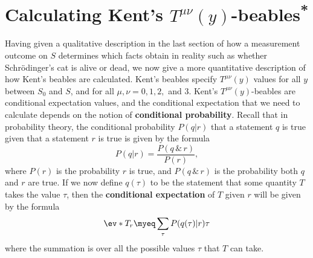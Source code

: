 \documentclass[12pt]{report}
\begin{document}


\section{Calculating Kent's $T^{\mu\nu}(y)$-beables\textsuperscript{*} \label{kentcalculation}}
Having given a qualitative description in the last section of how a measurement outcome on $S$ determines which facts obtain in reality such as whether Schr\"{o}dinger's cat is alive or dead, we now give a more quantitative description of how Kent's beables are calculated. Kent's beables specify $T^{\mu\nu}(y)$ values for all $y$ between $S_0$ and $S$, and for all $\mu,\nu = 0, 1, 2,$ and $3$. Kent's $T^{\mu\nu}(y)$-beables are conditional expectation values, and the conditional expectation that we need to calculate depends on the notion of \textbf{conditional probability}. Recall that in probability theory, the conditional probability $P(q|r)$  %
%
that a statement $q$ is true given that a statement $r$ is true is given by the formula
\begin{equation} \label{conditionalprobability}
  P(q|r)=\frac{P(q\, \&\,  r)}{P(r)},
\end{equation} 
where $P(r)$  %
%
is the probability $r$ is true, and $P(q\, \&\,  r)$ is the probability both $q$ and $r$ are true.
If we now define $q(\tau)$ to be %
%
 the statement that some quantity $T$  takes the value $\tau$, then the  \textbf{conditional expectation} of  $T$ given $r$ will be given by the formula
\begin{equation}\label{conditionalexpectation}
\ev*{T}_r\myeq\sum_\tau P(q(\tau)|r)\tau
\end{equation} %
%
where the summation is over all the possible values $\tau$ that $T$ can take.
\end{document}
